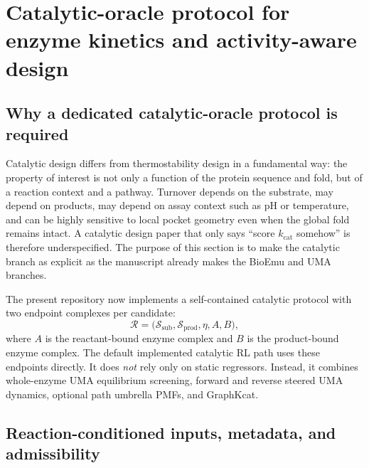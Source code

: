 \documentclass[11pt]{article}
\newcommand{\kcat}{\ensuremath{k_{\mathrm{cat}}}}
\begin{document}
	\section{Catalytic-oracle protocol for enzyme kinetics and activity-aware design}
	\label{sec:kcat}
	
	\subsection{Why a dedicated catalytic-oracle protocol is required}
	
	Catalytic design differs from thermostability design in a fundamental way: the property of interest is not only a function of the protein sequence and fold, but of a reaction context and a pathway. Turnover depends on the substrate, may depend on products, may depend on assay context such as pH or temperature, and can be highly sensitive to local pocket geometry even when the global fold remains intact. A catalytic design paper that only says ``score \kcat{} somehow'' is therefore underspecified. The purpose of this section is to make the catalytic branch as explicit as the manuscript already makes the BioEmu and UMA branches.
	
	The present repository now implements a self-contained catalytic protocol with two endpoint complexes per candidate:
	\begin{equation}
		\mathcal{R}=\big(\mathcal{S}_{\mathrm{sub}},\mathcal{S}_{\mathrm{prod}},\eta,A,B\big),
	\end{equation}
	where $A$ is the reactant-bound enzyme complex and $B$ is the product-bound enzyme complex. The default implemented catalytic RL path uses these endpoints directly. It does \emph{not} rely only on static regressors. Instead, it combines whole-enzyme UMA equilibrium screening, forward and reverse steered UMA dynamics, optional path umbrella PMFs, and GraphKcat.
	
	\subsection{Reaction-conditioned inputs, metadata, and admissibility}
	
\end{document}
